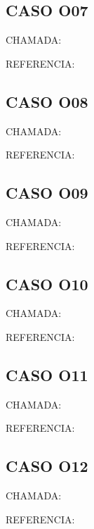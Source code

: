 \documentclass{undftex}
\begin{document}
\begin{refsection}\section*{CASO O07}\noindent CHAMADA: \par\noindent REFERENCIA:\par\printbibliography[heading=none]\end{refsection}\clearpage
\begin{refsection}\section*{CASO O08}\noindent CHAMADA: \par\noindent REFERENCIA:\par\printbibliography[heading=none]\end{refsection}\clearpage
\begin{refsection}\section*{CASO O09}\noindent CHAMADA: \par\noindent REFERENCIA:\par\printbibliography[heading=none]\end{refsection}\clearpage
\begin{refsection}\section*{CASO O10}\noindent CHAMADA: \par\noindent REFERENCIA:\par\printbibliography[heading=none]\end{refsection}\clearpage
\begin{refsection}\section*{CASO O11}\noindent CHAMADA: \par\noindent REFERENCIA:\par\printbibliography[heading=none]\end{refsection}\clearpage
\begin{refsection}\section*{CASO O12}\noindent CHAMADA: \par\noindent REFERENCIA:\par\printbibliography[heading=none]\end{refsection}\clearpage
\end{document}

